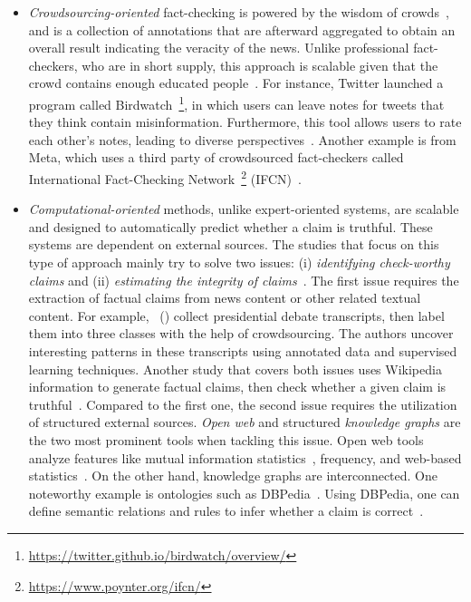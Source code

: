 \begin{description}
\begin{itemize}
        \item \emph{Crowdsourcing-oriented} fact-checking is powered by the wisdom of crowds~\parencite{WisdomOfCrowds_Galton}, and is a collection of annotations that are afterward aggregated to obtain an overall result indicating the veracity of the news. Unlike professional fact-checkers, who are in short supply, this approach is scalable given that the crowd contains enough educated people~\parencite{ScalingUpFactChecking_Allen}.  For instance, Twitter launched a program called Birdwatch~\footnote{\url{https://twitter.github.io/birdwatch/overview/}}, in which users can leave notes for tweets that they think contain misinformation. Furthermore, this tool allows users to rate each other’s notes, leading to diverse perspectives~\parencite{DiversityOfPerspectives_Twitter}. Another example is from Meta, which uses a third party of crowdsourced fact-checkers called International Fact-Checking Network~\footnote{\url{https://www.poynter.org/ifcn/}} (IFCN)~\parencite{MetaFactCheckingProgram_Meta}.
        \item \emph{Computational-oriented} methods, unlike expert-oriented systems, are scalable and designed to automatically predict whether a claim is truthful. These systems are dependent on external sources. The studies that focus on this type of approach mainly try to solve two issues: (i) \emph{identifying check-worthy claims} and (ii) \emph{estimating the integrity of claims}~\parencite{FakeNewsDetectionOnSocialMediaADataMiningPerspective_Shu}. The first issue requires the extraction of factual claims from news content or other related textual content. For example,~\citeauthor{DetectingCheckWorthyClaims_Hassan} (\citeyear{DetectingCheckWorthyClaims_Hassan}) collect presidential debate transcripts, then label them into three classes with the help of crowdsourcing. The authors uncover interesting patterns in these transcripts using annotated data and supervised learning techniques. Another study that covers both issues uses Wikipedia information to generate factual claims, then check whether a given claim is truthful~\parencite{FEVER_Thorne}. Compared to the first one, the second issue requires the utilization of structured external sources. \emph{Open web} and structured \emph{knowledge graphs} are the two most prominent tools when tackling this issue. Open web tools analyze features like mutual information statistics~\parencite{UnsupervisedNamedEntityExtraction_Etzioni}, frequency, and web-based statistics~\parencite{WebBasedStatisticalFactChecking_Magdy}.  On the other hand, knowledge graphs are interconnected. One noteworthy example is ontologies such as DBPedia~\parencite{DBPedia_Auer}. Using DBPedia, one can define semantic relations and rules to infer whether a claim is correct~\parencite{SemanticFakeNewsDetection_Bracsoveanu}.
    \end{itemize}
\end{description}
